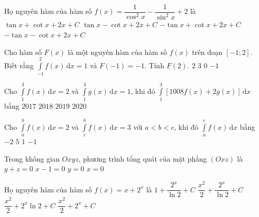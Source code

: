 \begin{ex}%
Họ nguyên hàm của hàm số $f(x)=\dfrac{1}{\cos^2 x}-\dfrac{1}{\sin^2 x}+2$ là
\choice
{\True $\tan x+\cot x+2x+C$}
{$\tan x-\cot x+2x+C$}
{$-\tan x+\cot x+2x+C$}
{$-\tan x-\cot x+2x+C$}
\end{ex}

\begin{ex}%
Cho hàm số $F(x)$ là một nguyên hàm của hàm số $f(x)$ trên đoạn $[-1; 2]$. Biết rằng $\displaystyle\int\limits_{-1}^2 f(x)\mathrm{\,d}x=1$ và $F(-1)=-1$. Tính $F(2)$.
\choice
{$2$}
{$3$}
{\True $0$}
{$-1$}
\end{ex}

\begin{ex}%
Cho $ \displaystyle \int\limits_1^3 f(x) \mathrm{\,d}x=2 $ và $ \displaystyle \int\limits_1^3 g(x) \mathrm{\,d}x=1 $, khi đó $ \displaystyle \int\limits_1^3 \left[1008 f(x)+2g(x)\right] \mathrm{\,d}x $ bằng
\choice
{$ 2017 $}
{\True $ 2018 $}
{$ 2019 $}
{$ 2020 $}
\end{ex}

\begin{ex}%
Cho $\displaystyle\int\limits_a^b f(x)\mathrm{\,d}x=2$ và $\displaystyle\int\limits_c^b f(x)\mathrm{\,d}x=3$ với $a<b<c$, khi đó $\displaystyle\int\limits_a^c f(x)\mathrm{\,d}x$ bằng
\choice
{$-2$}
{$5$}
{$1$}
{\True $-1$}
\end{ex}

\begin{ex}%
Trong không gian $Oxyz$, phương trình tổng quát của mặt phẳng $(Oxz)$ là
\choice
{$y+z=0$}
{$x-1=0$}
{\True $y=0$}
{$x=0$}
\end{ex}

\begin{ex}%
Họ nguyên hàm của hàm số $f(x)=x+2^x$ là
\choice
{$1+\dfrac{2^x}{\ln 2}+C$}
{\True $\dfrac{x^2}{2}+\dfrac{2^x}{\ln 2}+C$}
{$\dfrac{x^2}{2}+2^x \ln 2+C$}
{$\dfrac{x^2}{2}+2^x+C$}
\end{ex}

